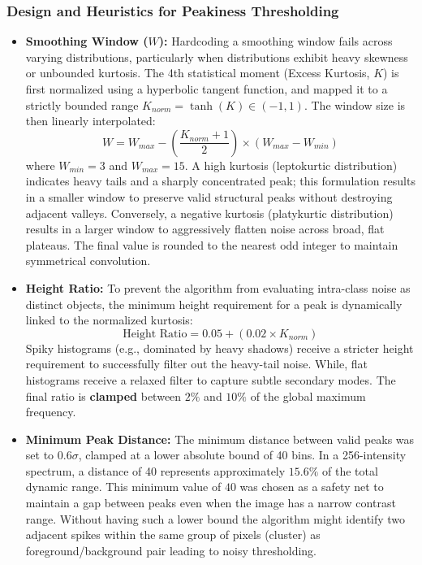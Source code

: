 \documentclass[11pt, letterpaper]{article}
\begin{document}
\subsubsection{Design and Heuristics for Peakiness Thresholding}
\begin{itemize}
    \item \textbf{Smoothing Window ($W$):} Hardcoding a smoothing window fails across varying distributions, particularly when distributions exhibit heavy skewness or unbounded kurtosis. The 4th statistical moment (Excess Kurtosis, $K$) is first normalized using a hyperbolic tangent function, and mapped it to a strictly bounded range $K_{norm} = \tanh(K) \in (-1, 1)$. The window size is then linearly interpolated:
    \[ W = W_{max} - \left( \frac{K_{norm} + 1}{2} \right) \times (W_{max} - W_{min}) \]
    where $W_{min} = 3$ and $W_{max} = 15$. A high kurtosis (leptokurtic distribution) indicates heavy tails and a sharply concentrated peak; this formulation results in a smaller window to preserve valid structural peaks without destroying adjacent valleys. Conversely, a negative kurtosis (platykurtic distribution) results in a larger window to aggressively flatten noise across broad, flat plateaus. The final value is rounded to the nearest odd integer to maintain symmetrical convolution.
    
    \item \textbf{Height Ratio:} To prevent the algorithm from evaluating intra-class noise as distinct objects, the minimum height requirement for a peak is dynamically linked to the normalized kurtosis: 
    \[ \text{Height Ratio} = 0.05 + (0.02 \times K_{norm}) \]
    Spiky histograms (e.g., dominated by heavy shadows) receive a stricter height requirement to successfully filter out the heavy-tail noise. While, flat histograms receive a relaxed filter to capture subtle secondary modes. The final ratio is \textbf{clamped} between $2\%$ and $10\%$ of the global maximum frequency.
    
    \item \textbf{Minimum Peak Distance:} The minimum distance between valid peaks was set to $0.6 \sigma$, clamped at a lower absolute bound of 40 bins. In a 256-intensity spectrum, a distance of 40 represents approximately $15.6\%$ of the total dynamic range. This minimum value of $40$ was chosen as a safety net to maintain a gap between peaks even when the image has a narrow contrast range. Without having such a lower bound the algorithm might identify two adjacent spikes within the same group of pixels (cluster) as foreground/background pair leading to noisy thresholding. 
\end{itemize}
\newpage
\end{document}
